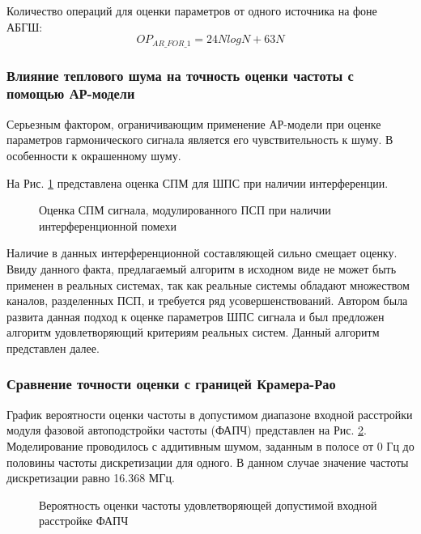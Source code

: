 Количество операций для оценки параметров от одного источника на фоне АБГШ:
\begin{equation}
	OP_{AR\_FOR\_1} = 24NlogN + 63N
\end{equation}

\subsubsection{Влияние теплового шума на точность оценки частоты с помощью АР-модели}
Серьезным фактором, ограничивающим применение АР-модели при оценке параметров гармонического сигнала является
его чувствительность к шуму. В особенности к окрашенному шуму.

На Рис. \ref{pic:lpc_psd_2} представлена оценка СПМ для ШПС при наличии интерференции.
\begin{figure}[h]
	\center{}
	\caption{Оценка СПМ сигнала, модулированного ПСП при наличии интерференционной помехи}
	\label{pic:lpc_psd_2}
\end{figure}

Наличие в данных интерференционной составляющей сильно смещает оценку. Ввиду данного факта, предлагаемый алгоритм в исходном виде
не может быть применен в реальных системах, так как реальные системы обладают множеством каналов, разделенных ПСП, и требуется ряд усовершенствований.
Автором была развита данная подход к оценке параметров ШПС сигнала и был предложен алгоритм удовлетворяющий критериям реальных систем. Данный
алгоритм представлен далее.

\subsubsection{Сравнение точности оценки с границей Крамера-Рао}
График вероятности оценки частоты в допустимом диапазоне входной расстройки модуля фазовой автоподстройки частоты (ФАПЧ) представлен на Рис.
\ref{pic:lpc_for_1_probability}. Моделирование проводилось с аддитивным шумом, заданным в полосе от 0 Гц до
половины частоты дискретизации для одного. В данном случае значение частоты дискретизации равно 16.368 МГц.
\begin{figure}[H]
\center{}
	\caption{Вероятность оценки частоты удовлетворяющей допустимой входной расстройке ФАПЧ}
	\label{pic:lpc_for_1_probability}
\end{figure}

